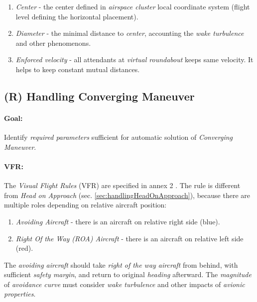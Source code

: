 \begin{enumerate}
    \item \emph{Center} - the center defined in \emph{airspace cluster} local coordinate system (flight level defining the horizontal placement).
    
    \item \emph{Diameter} - the minimal distance to \emph{center}, accounting the \emph{wake turbulence} and other phenomenons. 
    
    \item \emph{Enforced velocity} - all attendants at \emph{virtual roundabout} keeps same velocity. It helps to keep constant mutual distances.
\end{enumerate}



\subsection{(R) Handling Converging Maneuver}\label{sec:handlingConvergingManuever}

\paragraph{Goal:} Identify \emph{required parameters} sufficient for automatic solution of \emph{Converging Maneuver}.

\paragraph{VFR:} The \emph{Visual Flight Rules} (VFR) are specified in annex 2 \cite{icaoAnnex2}. The rule is different from \emph{Head on Approach} (sec. \ref{sec:handlingHeadOnApproach}), because there are multiple roles depending on relative aircraft position:
\begin{enumerate}
    \item \emph{Avoiding Aircraft} - there is an aircraft on relative right side (blue). 
    \item \emph{Right Of the Way (ROA) Aircraft} - there is an aircraft on relative left side (red). 
\end{enumerate}

The \emph{avoiding aircraft} should take \emph{right of the way aircraft} from behind, with sufficient \emph{safety margin}, and return to original \emph{heading} afterward. The \emph{magnitude} of \emph{avoidance curve} must consider \emph{wake turbulence} and other impacts of \emph{avionic properties}.

